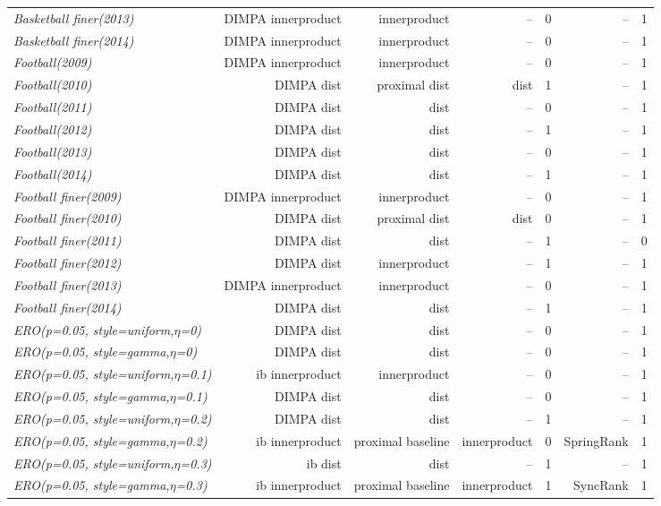 \documentclass[nohyperref]{article}
\theoremstyle{plain}
\theoremstyle{definition}
\theoremstyle{remark}
\begin{document}
\begin{table*}[!ht]
{\begin{tabular}{lrrrrrr}
			{\it Basketball finer(2013)} & DIMPA innerproduct & innerproduct & -- & 0 & -- & 1 \\
			{\it Basketball finer(2014)} & DIMPA innerproduct & innerproduct & -- & 0 & -- & 1 \\
			{\it Football(2009)} & DIMPA innerproduct & innerproduct & -- & 0 & -- & 1 \\
			{\it Football(2010)} & DIMPA dist & proximal dist & dist & 1 & -- & 1 \\
			{\it Football(2011)} & DIMPA dist & dist & -- & 0 & -- & 1 \\
			{\it Football(2012)} & DIMPA dist & dist & -- & 1 & -- & 1 \\
			{\it Football(2013)} & DIMPA dist & dist & -- & 0 & -- & 1 \\
			{\it Football(2014)} & DIMPA dist & dist & -- & 1 & -- & 1 \\
			{\it Football finer(2009)} & DIMPA innerproduct & innerproduct & -- & 0 & -- & 1 \\
			{\it Football finer(2010)} & DIMPA dist & proximal dist & dist & 0 & -- & 1 \\
			{\it Football finer(2011)} & DIMPA dist & dist & -- & 1 & -- & 0 \\
			{\it Football finer(2012)} & DIMPA dist & innerproduct & -- & 1 & -- & 1 \\
			{\it Football finer(2013)} & DIMPA innerproduct & innerproduct & -- & 0 & -- & 1 \\
			{\it Football finer(2014)} & DIMPA dist & dist & -- & 1 & -- & 1 \\
			{\it ERO(p=0.05, style=uniform,$\eta$=0)} & DIMPA dist & dist & -- & 0 & -- & 1 \\
			{\it ERO(p=0.05, style=gamma,$\eta$=0)} & DIMPA dist & dist & -- & 0 & -- & 1 \\
			{\it ERO(p=0.05, style=uniform,$\eta$=0.1)} & ib innerproduct & innerproduct & -- & 0 & -- & 1 \\
			{\it ERO(p=0.05, style=gamma,$\eta$=0.1)} & DIMPA dist & dist & -- & 0 & -- & 1 \\
			{\it ERO(p=0.05, style=uniform,$\eta$=0.2)} & DIMPA dist & dist & -- & 1 & -- & 1 \\
			{\it ERO(p=0.05, style=gamma,$\eta$=0.2)} & ib innerproduct & proximal baseline & innerproduct & 0 & SpringRank & 1 \\
			{\it ERO(p=0.05, style=uniform,$\eta$=0.3)} & ib dist & dist & -- & 1 & -- & 1 \\
			{\it ERO(p=0.05, style=gamma,$\eta$=0.3)} & ib innerproduct & proximal baseline & innerproduct & 1 & SyncRank & 1 \\

\end{tabular}}
\end{table*}
\end{document}
